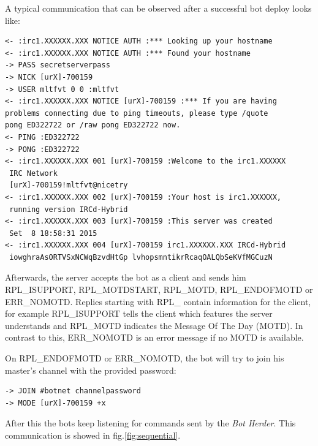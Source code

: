 \documentclass[]{article}
\begin{document}
A typical communication that can be observed after a successful bot deploy looks like:

\begin{lstlisting}
<- :irc1.XXXXXX.XXX NOTICE AUTH :*** Looking up your hostname
<- :irc1.XXXXXX.XXX NOTICE AUTH :*** Found your hostname
-> PASS secretserverpass
-> NICK [urX]-700159
-> USER mltfvt 0 0 :mltfvt
<- :irc1.XXXXXX.XXX NOTICE [urX]-700159 :*** If you are having 
problems connecting due to ping timeouts, please type /quote 
pong ED322722 or /raw pong ED322722 now.
<- PING :ED322722
-> PONG :ED322722
<- :irc1.XXXXXX.XXX 001 [urX]-700159 :Welcome to the irc1.XXXXXX
 IRC Network
 [urX]-700159!mltfvt@nicetry
<- :irc1.XXXXXX.XXX 002 [urX]-700159 :Your host is irc1.XXXXXX,
 running version IRCd-Hybrid
<- :irc1.XXXXXX.XXX 003 [urX]-700159 :This server was created
 Set  8 18:58:31 2015
<- :irc1.XXXXXX.XXX 004 [urX]-700159 irc1.XXXXXX.XXX IRCd-Hybrid
 iowghraAsORTVSxNCWqBzvdHtGp lvhopsmntikrRcaqOALQbSeKVfMGCuzN
\end{lstlisting}

Afterwards, the server accepts the bot as a client and sends him RPL\_ISUPPORT, RPL\_MOTDSTART, RPL\_MOTD, RPL\_ENDOFMOTD or ERR\_NOMOTD. Replies starting with RPL\_ contain information for the client, for example RPL\_ISUPPORT tells the client which features the server understands and RPL\_MOTD indicates the Message Of The Day (MOTD). In contrast to this, ERR\_NOMOTD is an error message if no MOTD is available.

On RPL\_ENDOFMOTD or ERR\_NOMOTD, the bot will try to join his master’s channel with the provided password:

\begin{lstlisting}
-> JOIN #botnet channelpassword
-> MODE [urX]-700159 +x
\end{lstlisting}

After this the bots keep listening for commands sent by the \textit{Bot Herder}. This communication is showed in fig.\ref{fig:sequential}.
\end{document}

